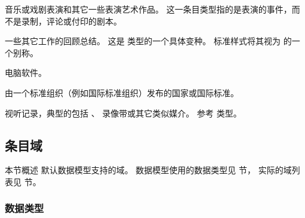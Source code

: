 \begin{typelist}
音乐或戏剧表演和其它一些表演艺术作品。
这一条目类型指的是表演的事件，而不是录制，评论或付印的剧本。

一些其它工作的回顾总结。
这是  类型的一个具体变种。
标准样式将其视为  的一个别称。

电脑软件。

由一个标准组织（例如国际标准组织）发布的国家或国际标准。

视听记录，典型的包括 、 录像带或其它类似媒介。
参考  类型。

\end{typelist}

\subsection{条目域}%
\label{bib:fld}


本节概述 \biblatex 默认数据模型支持的域。
数据模型使用的数据类型见  节，
实际的域列表见  节。

\subsubsection{数据类型}%
\label{bib:fld:typ}

